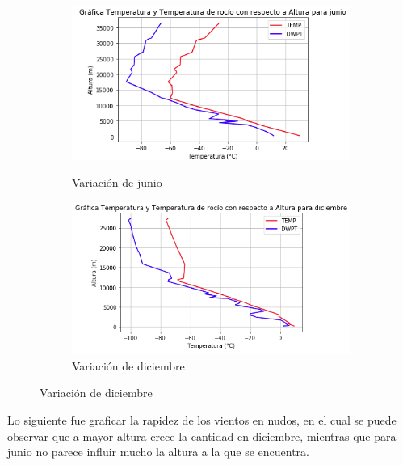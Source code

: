 \documentclass{article}
\begin{document}
\begin{figure}[h!]
\begin{subfigure}{.30\textwidth}
  \
  \includegraphics[width=.8\linewidth]{tempr.png}
  \caption{Variación de junio}
  \label{fig:sfig1}
\end{subfigure}
\begin{subfigure}{.30\textwidth}
  \left
  \includegraphics[width=.8\linewidth]{tempr2.png}
  \caption{Variación de diciembre}
  \label{fig:sfig2}
\end{subfigure}
\end{figure}

Lo siguiente fue graficar la rapidez de los vientos en nudos, en el cual se puede observar que a mayor altura crece la cantidad en diciembre, mientras que para junio no parece influir mucho la altura a la que se encuentra.

\newpage
\end{document}

